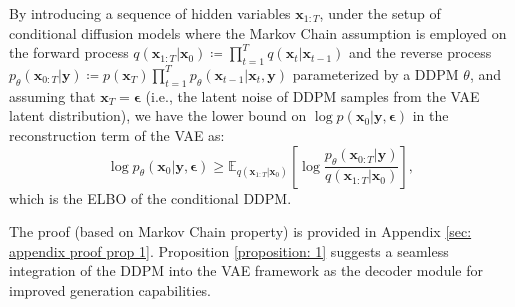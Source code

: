 \begin{proposition}
    By introducing a sequence of hidden variables $\mathbf{x}_{1:T}$, under the setup of conditional diffusion models where the Markov Chain assumption is employed on the forward process $q(\mathbf{x}_{1:T}|\mathbf{x}_0)\coloneq\prod_{t=1}^Tq(\mathbf{x}_t|\mathbf{x}_{t-1})$ and the reverse process $p_\theta(\mathbf{x}_{0:T}|\mathbf{y})\coloneq p(\mathbf{x}_T)\prod_{t=1}^Tp_\theta(\mathbf{x}_{t-1}|\mathbf{x}_t,\mathbf{y})$ parameterized by a DDPM $\theta$, and assuming that $\mathbf{x}_T=\boldsymbol{\epsilon}$ (i.e., the latent noise of DDPM samples from the VAE latent distribution), we have the lower bound on $\log p(\mathbf{x}_0|\mathbf{y},\boldsymbol{\epsilon})$ in the reconstruction term of the VAE as:
    \begin{equation}
        \log p_\theta(\mathbf{x}_0|\mathbf{y},\boldsymbol{\epsilon})\geq\mathbb{E}_{q(\mathbf{x}_{1:T}|\mathbf{x}_0)}\left[\log\frac{p_\theta({\mathbf{x}_{0:T}}|\mathbf{y})}{q(\mathbf{x}_{1:T}|\mathbf{x}_0)}\right],
    \label{eq: cddpm lower bound}
    \end{equation}
    which is the ELBO of the conditional DDPM. 
\label{proposition: 1}
\end{proposition}
The proof (based on Markov Chain property) is provided in Appendix \ref{sec: appendix proof prop 1}. Proposition \ref{proposition: 1} suggests a seamless integration of the DDPM into the VAE framework as the decoder module for improved generation capabilities. 

